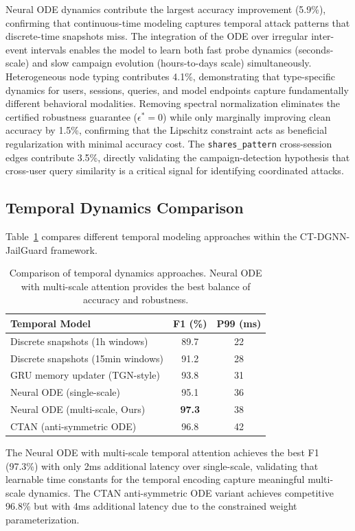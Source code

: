 \documentclass[journal]{IEEEtran}
\theoremstyle{plain}
\theoremstyle{definition}
\theoremstyle{remark}
\begin{document}
Neural ODE dynamics contribute the largest accuracy improvement (5.9\%), confirming that continuous-time modeling captures temporal attack patterns that discrete-time snapshots miss. The integration of the ODE over irregular inter-event intervals enables the model to learn both fast probe dynamics (seconds-scale) and slow campaign evolution (hours-to-days scale) simultaneously. Heterogeneous node typing contributes 4.1\%, demonstrating that type-specific dynamics for users, sessions, queries, and model endpoints capture fundamentally different behavioral modalities. Removing spectral normalization eliminates the certified robustness guarantee ($\epsilon^* = 0$) while only marginally improving clean accuracy by 1.5\%, confirming that the Lipschitz constraint acts as beneficial regularization with minimal accuracy cost. The \texttt{shares\_pattern} cross-session edges contribute 3.5\%, directly validating the campaign-detection hypothesis that cross-user query similarity is a critical signal for identifying coordinated attacks.

\subsection{Temporal Dynamics Comparison}

Table~\ref{tab:temporal} compares different temporal modeling approaches within the CT-DGNN-JailGuard framework.

\begin{table}[t]
\centering
\caption{Comparison of temporal dynamics approaches. Neural ODE with multi-scale attention provides the best balance of accuracy and robustness.}
\label{tab:temporal}
\begin{tabular}{@{}lcc@{}}
\toprule
\textbf{Temporal Model} & \textbf{F1 (\%)} & \textbf{P99 (ms)} \\
\midrule
Discrete snapshots (1h windows) & 89.7 & 22 \\
Discrete snapshots (15min windows) & 91.2 & 28 \\
GRU memory updater (TGN-style) & 93.8 & 31 \\
Neural ODE (single-scale) & 95.1 & 36 \\
Neural ODE (multi-scale, Ours) & \textbf{97.3} & 38 \\
CTAN (anti-symmetric ODE) & 96.8 & 42 \\
\bottomrule
\end{tabular}
\end{table}

The Neural ODE with multi-scale temporal attention achieves the best F1 (97.3\%) with only 2ms additional latency over single-scale, validating that learnable time constants for the temporal encoding capture meaningful multi-scale dynamics. The CTAN anti-symmetric ODE variant achieves competitive 96.8\% but with 4ms additional latency due to the constrained weight parameterization.
\end{document}
